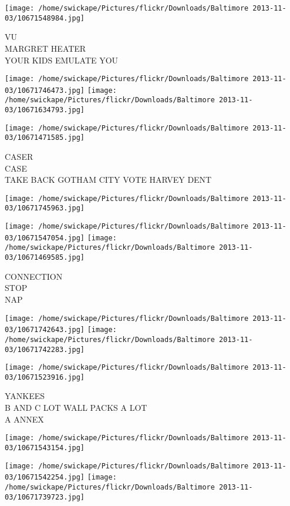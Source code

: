 \documentclass[10pt,letterpaper]{article}
\begin{document}
\vspace{0.25in}
\texttt{[image: /home/swickape/Pictures/flickr/Downloads/Baltimore 2013-11-03/10671548984.jpg]}

VU\\
MARGRET HEATER\\
YOUR KIDS EMULATE YOU\\
\pagebreak

\texttt{[image: /home/swickape/Pictures/flickr/Downloads/Baltimore 2013-11-03/10671746473.jpg]}
\texttt{[image: /home/swickape/Pictures/flickr/Downloads/Baltimore 2013-11-03/10671634793.jpg]}

\texttt{[image: /home/swickape/Pictures/flickr/Downloads/Baltimore 2013-11-03/10671471585.jpg]}

CASER\\
CASE\\
TAKE BACK GOTHAM CITY VOTE HARVEY DENT\\
\pagebreak

\texttt{[image: /home/swickape/Pictures/flickr/Downloads/Baltimore 2013-11-03/10671745963.jpg]}

\vspace{0.25in}
\texttt{[image: /home/swickape/Pictures/flickr/Downloads/Baltimore 2013-11-03/10671547054.jpg]}
\texttt{[image: /home/swickape/Pictures/flickr/Downloads/Baltimore 2013-11-03/10671469585.jpg]}

CONNECTION\\
STOP\\
NAP\\
\pagebreak

\texttt{[image: /home/swickape/Pictures/flickr/Downloads/Baltimore 2013-11-03/10671742643.jpg]}
\texttt{[image: /home/swickape/Pictures/flickr/Downloads/Baltimore 2013-11-03/10671742283.jpg]}

\texttt{[image: /home/swickape/Pictures/flickr/Downloads/Baltimore 2013-11-03/10671523916.jpg]}

YANKEES\\
B AND C LOT WALL PACKS A LOT\\
A ANNEX\\
\pagebreak

\texttt{[image: /home/swickape/Pictures/flickr/Downloads/Baltimore 2013-11-03/10671543154.jpg]}

\vspace{0.25in}
\texttt{[image: /home/swickape/Pictures/flickr/Downloads/Baltimore 2013-11-03/10671542254.jpg]}
\texttt{[image: /home/swickape/Pictures/flickr/Downloads/Baltimore 2013-11-03/10671739723.jpg]}
\end{document}
